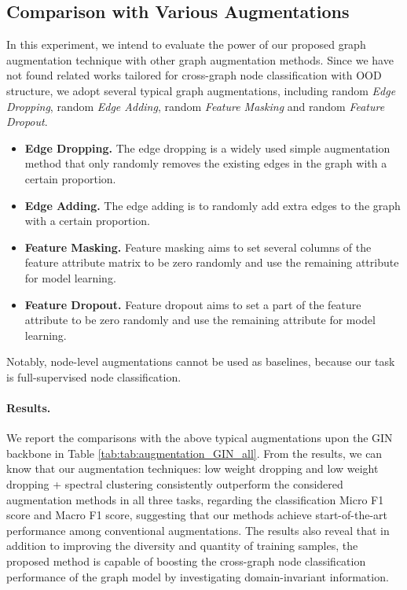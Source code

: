 \subsection{Comparison with Various Augmentations }
In this experiment, we intend to evaluate the power of our proposed graph augmentation technique with other graph augmentation methods. Since we have not found related works tailored for cross-graph node classification with OOD structure, we adopt several typical graph augmentations, including random \textit{Edge Dropping}, random \textit{Edge Adding}, random \textit{Feature Masking} and random \textit{Feature Dropout}.
\vspace{-2.5mm}
\begin{itemize}
    \item \textbf{Edge Dropping.} The edge dropping is a widely used simple augmentation method that only randomly removes the existing edges in the graph with a certain proportion. 
    
    \item \textbf{Edge Adding.} The edge adding is to randomly add extra edges to the graph with a certain proportion.

    \item \textbf{Feature Masking.} Feature masking aims to set several columns of the feature attribute matrix to be zero randomly and use the remaining attribute for model learning.

    \item \textbf{Feature Dropout.} Feature dropout aims to set a part of the feature attribute to be zero randomly and use the remaining attribute for model learning.
\end{itemize}
\vspace{-2.5mm}
Notably, node-level augmentations cannot be used as baselines, because our task is full-supervised node classification. 

\paragraph{Results.} We report the comparisons with the above typical augmentations upon the GIN backbone in Table \ref{tab:tab:augmentation_GIN_all}. 
From the results, we can know that
our augmentation techniques: low weight dropping and low weight dropping + spectral clustering consistently outperform the considered augmentation methods in all three tasks, regarding the classification Micro F1 score and Macro F1 score, suggesting that our methods achieve start-of-the-art  performance among conventional augmentations.
The results also reveal that in addition to improving the diversity and quantity of training samples, the proposed method is capable of boosting the cross-graph node classification performance of the graph model by investigating domain-invariant information.




